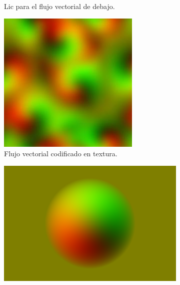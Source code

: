 \begin{figure}
\begin{subfigure}{0.45\textwidth}
		\caption{Lic para el flujo vectorial de debajo.}
		\label{fig:mylic2}
	\end{subfigure}
	\newline 
	\par\bigskip\par\bigskip
	\begin{subfigure}{0.45\textwidth}
		\includegraphics[height=\textwidth,width=\textwidth]{figures/mylic3.jpg}
		\caption{Flujo vectorial codificado en textura.}
		\label{fig:mylic3}
	\end{subfigure}
	\hfill
	\begin{subfigure}{0.45\textwidth}
		\includegraphics[height=\textwidth,width=\textwidth]{figures/mylic4.png}

\end{subfigure}
\end{figure}
